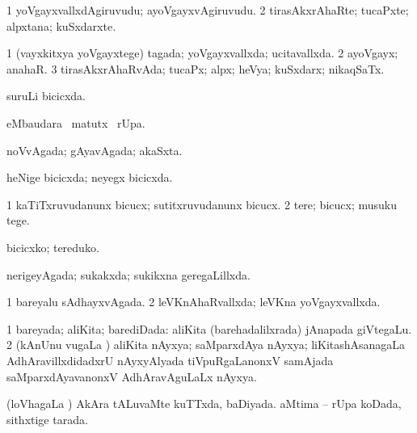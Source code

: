 {{\bentry
{} 
\gl{\nA}
\expl{}
\bmng
\bnum
\num{1} yoVgayxvallxdAgiruvudu; ayoVgayxvAgiruvudu. 
\num{2} tirasAkxrAhaRte; tucaPxte; alpxtana; kuSxdarxte. 
\enum
\emng
\eentry

\bentry
{} 
\gl{\gu}
\bmng
\bnum
\num{1} (vayxkitxya yoVgayxtege) tagada; yoVgayxvallxda; ucitavallxda. 
\num{2} ayoVgayx; anahaR. 
\num{3} tirasAkxrAhaRvAda; tucaPx; alpx; heVya; kuSxdarx; nikaqSaTx. 
\enum
\emng
\eentry

\bentry
{} 
\gl{\gu}
\expl{}
\bmng
suruLi bicicxda. 
\emng
\eentry

\bentry
{} 
\gl{\kirx}
\expl{}
\bmng
{} eMbaudara \BU\ matutx \BUkaq\ rUpa. 
\emng
\eentry

\bentry
{} 
\gl{\gu}
\expl{}
\bmng
noVvAgada; gAyavAgada; akaSxta. 
\emng
\eentry

\bentry
{} 
\gl{\gu}
\expl{}
\bmng
heNige bicicxda; neyegx bicicxda. 
\emng
\eentry

\bentry
{} 
\gl{\kirx}


\noindent
\gl{\sakirx}
\expl{}
\bmng
\bnum
\num{1} kaTiTxruvudanunx bicucx; sutitxruvudanunx bicucx. 
\num{2} tere; bicucx; musuku tege. 
\enum
\emng

\noindent
\gl{\akirx}
\expl{}
\bmng
bicicxko; tereduko. 
\emng
\eentry

\bentry
{} 
\gl{\gu}
\expl{}
\bmng
nerigeyAgada; sukakxda; sukikxna geregaLillxda. 
\emng
\eentry

\bentry
{} 
\gl{\gu}
\expl{}
\bmng
\bnum
\num{1} bareyalu sAdhayxvAgada. 
\num{2} leVKnAhaRvallxda; leVKna yoVgayxvallxda. 
\enum
\emng
\eentry

\bentry
{} 
\gl{\gu}
\expl{}
\bmng
\bnum
\num{1} bareyada; aliKita; barediDada:  aliKita (barehadalilxrada) jAnapada giVtegaLu. 
\num{2} (kAnUnu \mo vugaLa \vi) aliKita nAyxya; saMparxdAya nAyxya; liKitashAsanagaLa AdhAravillxdidadxrU nAyxyAlyada tiVpuRgaLanonxV samAjada saMparxdAyavanonxV AdhAravAguLaLx nAyxya. 
\enum
\emng
\eentry

\bentry
{} 
\gl{\gu}
\expl{}
\bmng
(loVhagaLa \vi) 
\banum
{} AkAra tALuvaMte kuTTxda, baDiyada. 
 aMtima -- rUpa koDada, sithxtige tarada. 
\eanum
\emng
\eentry

}}
